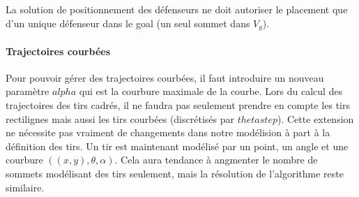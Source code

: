 \documentclass[12pt]{article}
\begin{document}
La solution de positionnement des défenseurs ne doit autoriser le placement que d'un unique défenseur dans le goal (un seul sommet dans $V_g$).

\paragraph{Trajectoires courbées}
Pour pouvoir gérer des trajectoires courbées, il faut introduire un nouveau paramètre $alpha$ qui est la courbure maximale de la courbe. Lors du calcul des trajectoires des tirs cadrés, il ne faudra pas seulement prendre en compte les tirs rectilignes mais aussi les tirs courbées (discrétisés par $thetastep$).
Cette extension ne nécessite pas vraiment de changements dans notre modélision à part à la définition des tirs. Un tir est maintenant modélisé par un point, un angle et une courbure $((x,y), \theta, \alpha)$. Cela aura tendance à angmenter le nombre de sommets modélisant des tirs seulement, mais la résolution de l'algorithme reste similaire.
\end{document}
